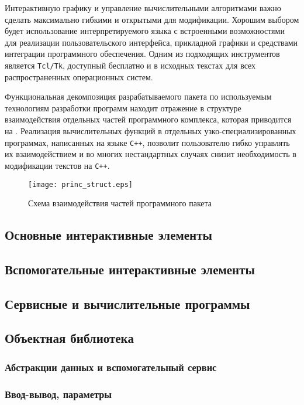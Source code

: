 Интерактивную графику и управление вычислительными алгоритмами важно
сделать максимально гибкими и открытыми для модификации.  Хорошим
выбором будет использование интерпретируемого языка с встроенными
возможностями для реализации пользовательского интерфейса, прикладной
графики и средствами интеграции программного обеспечения.  Одним из
подходящих инструментов является {\tt Tcl/Tk}, доступный бесплатно и в
исходных текстах для всех распространенных операционных систем.

Функциональная декомпозиция разрабатываемого пакета по используемым
технологиям разработки программ находит отражение в структуре
взаимодействия отдельных частей программного комплекса, которая
приводится на .  Реализация
вычислительных функций в отдельных узко-специализированных программах,
написанных на языке {\tt C++}, позволит пользователю гибко управлять
их взаимодействием и во многих нестандартных случаях снизит
необходимость в модификации текстов на {\tt C++}.

\begin{figure}
\centerline{\texttt{[image: princ\_struct.eps]}}
\caption{Схема взаимодействия частей программного пакета}
\label{fig:prog_interaction_struct}
\end{figure}

\subsection{Основные интерактивные элементы}
\subsection{Вспомогательные интерактивные элементы}
\subsection{Сервисные и вычислительные программы}


\subsection{Объектная библиотека}
\subsubsection{Абстракции данных и вспомогательный сервис}
\subsubsection{Ввод-вывод, параметры}
